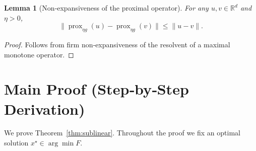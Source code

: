 \documentclass{article}
\newtheorem{lemma}{Lemma}
\newcommand{\prox}{\operatorname{prox}}
\newcommand{\R}{\mathbb{R}}
\begin{document}
\begin{lemma}[Non‑expansiveness of the proximal operator]
\label{lem:prox_ne}
For any $u,v\in\R^{d}$ and $\eta>0$,
\[
\big\|\prox_{\eta g}(u)-\prox_{\eta g}(v)\big\|\le\|u-v\|.
\]
\end{lemma}
\begin{proof}
Follows from firm non‑expansiveness of the resolvent of a maximal monotone operator. \qedhere
\end{proof}

\section*{Main Proof (Step‑by‑Step Derivation)}
We prove Theorem~\ref{thm:sublinear}. Throughout the proof we fix an optimal solution $x^{\star}\in\arg\min F$.
\end{document}
